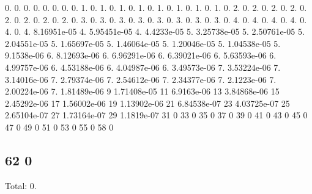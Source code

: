 0. 0. 0. 0. 0. 0. 0. 0. 1. 0. 1. 0. 1. 0. 1. 0. 1. 0. 1. 0. 1. 0. 1. 0. 2. 0. 2. 0. 2. 0. 2. 0. 2. 0. 2. 0. 2. 0. 2. 0. 3. 0. 3. 0. 3. 0. 3. 0. 3. 0. 3. 0. 3. 0. 3. 0. 4. 0. 4. 0. 4. 0. 4. 0. 4. 0. 4. 8.\+16951e-\/05 4. 5.\+95451e-\/05 4. 4.\+4233e-\/05 5. 3.\+25738e-\/05 5. 2.\+50761e-\/05 5. 2.\+04551e-\/05 5. 1.\+65697e-\/05 5. 1.\+46064e-\/05 5. 1.\+20046e-\/05 5. 1.\+04538e-\/05 5. 9.\+1538e-\/06 6. 8.\+12693e-\/06 6. 6.\+96291e-\/06 6. 6.\+39021e-\/06 6. 5.\+63593e-\/06 6. 4.\+99757e-\/06 6. 4.\+53188e-\/06 6. 4.\+04987e-\/06 6. 3.\+49573e-\/06 7. 3.\+53224e-\/06 7. 3.\+14016e-\/06 7. 2.\+79374e-\/06 7. 2.\+54612e-\/06 7. 2.\+34377e-\/06 7. 2.\+1223e-\/06 7. 2.\+00224e-\/06 7. 1.\+81489e-\/06 9 1.\+71408e-\/05 11 6.\+9163e-\/06 13 3.\+84868e-\/06 15 2.\+45292e-\/06 17 1.\+56002e-\/06 19 1.\+13902e-\/06 21 6.\+84538e-\/07 23 4.\+03725e-\/07 25 2.\+65104e-\/07 27 1.\+73164e-\/07 29 1.\+1819e-\/07 31 0 33 0 35 0 37 0 39 0 41 0 43 0 45 0 47 0 49 0 51 0 53 0 55 0 58 0 \subsection*{62 0 }

Total\+: 0. 